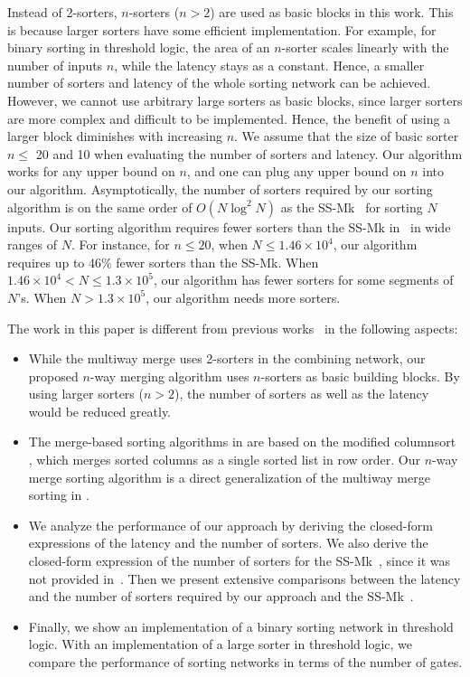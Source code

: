 \documentclass[10pt,journal,cspaper,compsoc]{IEEEtran}
\begin{document}
Instead of 2-sorters, $n$-sorters ($n > 2$) are used as basic blocks in this work. This is because larger sorters have some efficient implementation. For example, for binary sorting in threshold logic, the area of an $n$-sorter scales linearly with the number of inputs $n$, while the latency stays as a constant. Hence, a smaller number of sorters and latency of the whole sorting network can be achieved. However, we cannot use arbitrary large sorters as basic blocks, since larger sorters are more complex and difficult to be implemented. Hence, the benefit of using a larger block diminishes with increasing $n$.
We assume that the size of basic sorter $n \le$ 20 and 10 when evaluating the number of sorters and latency. Our algorithm works for any upper bound on $n$, and one can plug any upper bound on $n$ into our algorithm. Asymptotically, the number of sorters required by our sorting algorithm is on the same order of $O(N\log^2 N)$ as the SS-Mk~\cite{gao1997sloping} for sorting $N$ inputs. Our sorting algorithm requires fewer sorters than the SS-Mk in~\cite{gao1997sloping} in wide ranges of $N$.
For instance, for $n\le 20$, when $N \le 1.46\times 10^4$, our algorithm requires up to 46\% fewer sorters than the SS-Mk. When $1.46 \times 10^4 < N \le 1.3 \times 10^5$, our algorithm has fewer sorters for some segments of $N$'s. When $N > 1.3 \times 10^5$, our algorithm needs more sorters.

The work in this paper is different from previous works~\cite{Lee95multiway,gao1997sloping,zhao1998efficient} in the following aspects:
\begin{itemize}
  \item While the multiway merge \cite{Lee95multiway} uses 2-sorters in the combining network, our proposed $n$-way merging algorithm uses $n$-sorters as basic building blocks. By using larger sorters ($n > 2$), the number of sorters as well as the latency would be reduced greatly.
  \item The merge-based sorting algorithms in \cite{gao1997sloping,zhao1998efficient} are based on the modified columnsort \cite{liszka1993generalized}, which merges sorted columns as a single sorted list in row order. Our $n$-way merge sorting algorithm is a direct generalization of the multiway merge sorting in \cite{Lee95multiway}.
\item We analyze the performance of our approach by deriving the closed-form expressions of the latency and the number of sorters. We also derive the closed-form expression of the number of sorters for the SS-Mk~\cite{gao1997sloping}, since it was not provided in~\cite{gao1997sloping}. Then we present extensive comparisons between  the latency and the number of sorters required by our approach and the SS-Mk~\cite{gao1997sloping}.
  \item Finally, we show an implementation of a binary sorting network in threshold logic. With an implementation of a large sorter in threshold logic, we compare the performance of sorting networks in terms of the number of gates.
\end{itemize}
\end{document}
